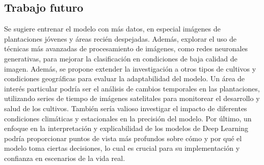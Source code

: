 \subsection{Trabajo futuro}

Se sugiere entrenar el modelo con más datos, en especial imágenes de plantaciones jóvenes y áreas recién despejadas. Además, explorar el uso de técnicas más avanzadas de procesamiento de imágenes, como redes neuronales generativas, para mejorar la clasificación en condiciones de baja calidad de imagen. Además, se propone extender la investigación a otros tipos de cultivos y condiciones geográficas para evaluar la adaptabilidad del modelo. Un área de interés particular podría ser el análisis de cambios temporales en las plantaciones, utilizando series de tiempo de imágenes satelitales para monitorear el desarrollo y salud de los cultivos. También sería valioso investigar el impacto de diferentes condiciones climáticas y estacionales en la precisión del modelo. Por último, un enfoque en la interpretación y explicabilidad de los modelos de Deep Learning podría proporcionar puntos de vista más profundos sobre cómo y por qué el modelo toma ciertas decisiones, lo cual es crucial para su implementación y confianza en escenarios de la vida real.
